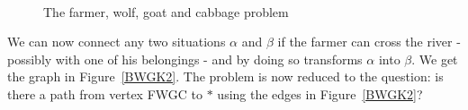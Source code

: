 \begin{figure}[ht]
\mbox{
\hspace{1cm}
\hspace{2.5cm}
 }
\caption{The farmer, wolf, goat and cabbage problem}
\end{figure}

We can now connect any two situations $\alpha$ and $\beta$ if the
farmer can cross the river - possibly with one of his belongings - and
by doing so transforms $\alpha$ into $\beta$. We get the graph in
Figure~\ref{BWGK2}.  The problem is now reduced to the question: is
there a path from vertex FWGC to $\ast$ using the edges in
Figure~\ref{BWGK2}?


